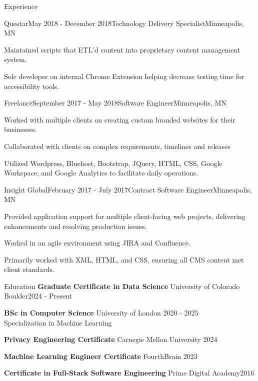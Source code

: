 \documentclass[
	12pt, %
]{resume} %
\begin{document}
\begin{rSection}{Experience}
	\pagebreak

	\begin{rSubsection}{Questar}{May 2018 - December 2018}{Technology Delivery Specialist}{Minneapolis, MN}
		\item Maintained scripts that ETL'd content into proprietary content management system.
		\item Sole developer on internal Chrome Extension helping decrease testing time for accessibility tools.
	\end{rSubsection}


\begin{rSubsection}{Freelance}{September 2017 - May 2018}{Software Engineer}{Minneapolis, MN}
	\item Worked with multiple clients on creating custom branded websites for their businesses.
	\item Collaborated with clients on complex requirements, timelines and releases
	\item Utilized Wordpress, Bluehost, Bootstrap, JQuery, HTML, CSS, Google Workspace, and Google Analytics to facilitate daily operations.
\end{rSubsection}


	\begin{rSubsection}{Insight Global}{February 2017 - July 2017}{Contract Software Engineer}{Minneapolis, MN}
		\item Provided application support for multiple client-facing web projects, delivering enhancements and resolving production issues.
		\item Worked in an agile environment using JIRA and Confluence.
		\item Primarily worked with XML, HTML, and CSS, ensuring all CMS content met client standards.
	\end{rSubsection}

\end{rSection}


\begin{rSection}{Education}
	\textbf{Graduate Certificate in Data Science} University of Colorado Boulder\hfill{2024 - Present}

	\textbf{BSc in Computer Science} University of London \hfill{2020 - 2025} \\ 
	Specialization in Machine Learning \smallskip

	\textbf{Privacy Engineering Certificate} Carnegie Mellon University \hfill{2024}

	\textbf{Machine Learning Engineer Certificate} FourthBrain \hfill{2023}

	\textbf{Certificate in Full-Stack Software Engineering} Prime Digital Academy\hfill{2016}
\end{rSection}
\end{document}
